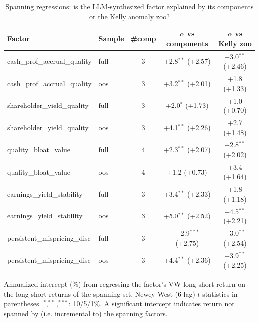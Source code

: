 \begin{table}[htbp]\centering
\caption{Spanning regressions: is the LLM-synthesized factor explained by its components or the Kelly anomaly zoo?}
\label{tab:spanning}
\begin{threeparttable}\footnotesize
\begin{tabular}{llccc}
\toprule
Factor & Sample & \#comp & $\alpha$ vs components & $\alpha$ vs Kelly zoo \\
\midrule
cash\_prof\_accrual\_quality & full & 3 & +2.8$^{**}$ (+2.57) & +3.0$^{**}$ (+2.46) \\
cash\_prof\_accrual\_quality & oos & 3 & +3.2$^{**}$ (+2.01) & +1.8 (+1.33) \\
shareholder\_yield\_quality & full & 3 & +2.0$^{*}$ (+1.73) & +1.0 (+0.70) \\
shareholder\_yield\_quality & oos & 3 & +4.1$^{**}$ (+2.26) & +2.7 (+1.48) \\
quality\_bloat\_value & full & 4 & +2.3$^{**}$ (+2.07) & +2.8$^{**}$ (+2.02) \\
quality\_bloat\_value & oos & 4 & +1.2 (+0.73) & +3.4 (+1.64) \\
earnings\_yield\_stability & full & 3 & +3.4$^{**}$ (+2.33) & +1.8 (+1.18) \\
earnings\_yield\_stability & oos & 3 & +5.0$^{**}$ (+2.52) & +4.5$^{**}$ (+2.21) \\
persistent\_mispricing\_disc & full & 3 & +2.9$^{***}$ (+2.75) & +3.0$^{**}$ (+2.54) \\
persistent\_mispricing\_disc & oos & 3 & +4.4$^{**}$ (+2.36) & +3.9$^{**}$ (+2.25) \\
\bottomrule
\end{tabular}
\begin{tablenotes}\footnotesize
\item Annualized intercept (\%) from regressing the factor's VW long-short return on the long-short returns of the spanning set. Newey-West (6 lag) $t$-statistics in parentheses. $^{*},^{**},^{***}$: 10/5/1\%. A significant intercept indicates return not spanned by (i.e. incremental to) the spanning factors.
\end{tablenotes}
\end{threeparttable}
\end{table}
